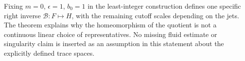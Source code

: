 \documentclass[10pt,a4paper]{article}
\begin{document}
Fixing $m=0$, $\epsilon=1$, $b_0=1$ in the least-integer construction
defines one specific right inverse $\mathcal B:F\mapsto H$, with the
remaining cutoff scales depending on the jets. The theorem explains why the
homeomorphism of the quotient is not a continuous linear choice of
representatives. No missing fluid estimate or singularity claim is inserted
as an assumption in this statement about the explicitly defined trace spaces.
\end{document}
